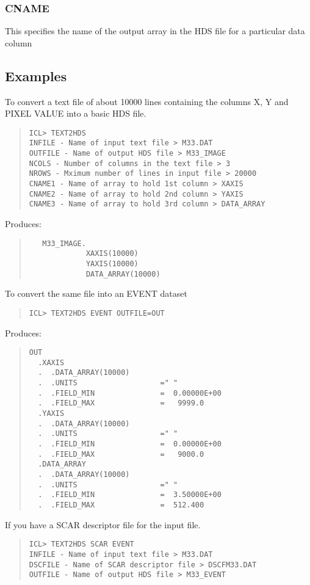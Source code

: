 \documentclass{book}
\renewcommand{\_}{{\tt\char'137}}     %
\begin{document}
\subsubsection{CNAME}
This specifies the name of the output array in the HDS file for
a particular data column

\subsection{Examples}
To convert a text file of about 10000 lines containing the columns
X, Y and PIXEL VALUE into a basic HDS file.

\begin{quote}\begin{verbatim}
ICL> TEXT2HDS
INFILE - Name of input text file > M33.DAT
OUTFILE - Name of output HDS file > M33_IMAGE
NCOLS - Number of columns in the text file > 3
NROWS - Mximum number of lines in input file > 20000
CNAME1 - Name of array to hold 1st column > XAXIS
CNAME2 - Name of array to hold 2nd column > YAXIS
CNAME3 - Name of array to hold 3rd column > DATA_ARRAY
\end{verbatim}\end{quote}
Produces:
\begin{quote}\begin{verbatim}
   M33_IMAGE.
             XAXIS(10000)
             YAXIS(10000)
             DATA_ARRAY(10000)
\end{verbatim}\end{quote}
To convert the same file into an EVENT dataset
\begin{quote}\begin{verbatim}
ICL> TEXT2HDS EVENT OUTFILE=OUT
\end{verbatim}\end{quote}
Produces:
\begin{quote}\begin{verbatim}
OUT
  .XAXIS
  .  .DATA_ARRAY(10000)
  .  .UNITS                   =" "
  .  .FIELD_MIN               =  0.00000E+00
  .  .FIELD_MAX               =   9999.0
  .YAXIS
  .  .DATA_ARRAY(10000)
  .  .UNITS                   =" "
  .  .FIELD_MIN               =  0.00000E+00
  .  .FIELD_MAX               =   9000.0
  .DATA_ARRAY
  .  .DATA_ARRAY(10000)
  .  .UNITS                   =" "
  .  .FIELD_MIN               =  3.50000E+00
  .  .FIELD_MAX               =  512.400
\end{verbatim}\end{quote}
If you have a SCAR descriptor file for the input file.
\begin{quote}\begin{verbatim}
ICL> TEXT2HDS SCAR EVENT
INFILE - Name of input text file > M33.DAT
DSCFILE - Name of SCAR descriptor file > DSCFM33.DAT
OUTFILE - Name of output HDS file > M33_EVENT
\end{verbatim}\end{quote}
\end{document}
